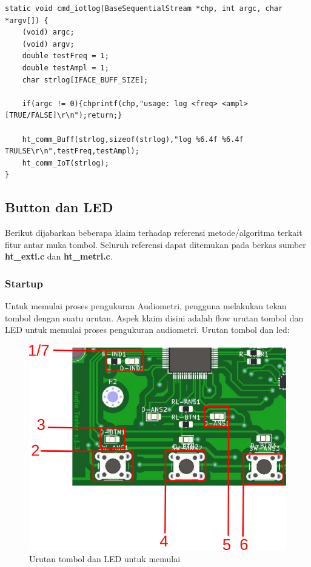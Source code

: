 \documentclass[12pt,]{article}
\begin{document}
	\begin{verbatim}
static void cmd_iotlog(BaseSequentialStream *chp, int argc, char *argv[]) {
	(void) argc;
	(void) argv;
	double testFreq = 1;
	double testAmpl = 1;
	char strlog[IFACE_BUFF_SIZE];
	
	if(argc != 0){chprintf(chp,"usage: log <freq> <ampl> [TRUE/FALSE]\r\n");return;}
	
	ht_comm_Buff(strlog,sizeof(strlog),"log %6.4f %6.4f TRULSE\r\n",testFreq,testAmpl);
	ht_comm_IoT(strlog);
}
	\end{verbatim}
	
	\newpage
	\subsection{Button dan LED}
	
	Berikut dijabarkan beberapa klaim terhadap referensi metode/algoritma terkait fitur antar muka tombol.
	Seluruh referensi dapat ditemukan pada berkas sumber \textbf{ht\_exti.c} dan \textbf{ht\_metri.c}.
	
	\subsubsection{Startup}
	
	Untuk memulai proses pengukuran Audiometri, pengguna melakukan tekan tombol dengan suatu urutan.
	Aspek klaim disini adalah flow urutan tombol dan LED untuk memulai proses pengukuran audiometri.
	Urutan tombol dan led:
	
	\begin{figure}[!ht]
		\centering
		\includegraphics[width=400pt]{images/ledbutton_step}
		\caption{Urutan tombol dan LED untuk memulai}
	\end{figure}
\end{document}
